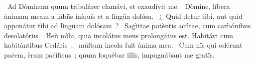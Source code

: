 ~Ad Dòminum quum tribulárer clamávi, et exaudívit me. 
~Dòmine, líbera ànimam meam a lábiïs iníquïs et a lìngüa dolósa. 
~¿~Quid detur tìbi, aut quid apponátur tìbi ad lìngüam dolósam~? 
~Saġìttae potèntis acútae, cum carbónibus desolatóriïs. 
~Heŭ mìhi, quia incolátus meus prolongátus est. Habitávi cum habitàntibus Cedáris~; 
~mùltum ìncola fuit ànima mea. 
~Cum hïs qui odérunt paċem, èram paċìficus~; quum loquébar illïs, impugnábant me gratïs. 
